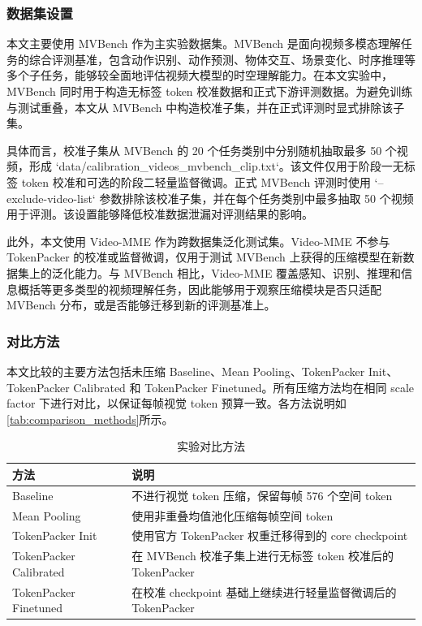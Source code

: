 \subsubsection{数据集设置}

本文主要使用 MVBench 作为主实验数据集。MVBench 是面向视频多模态理解任务的综合评测基准，包含动作识别、动作预测、物体交互、场景变化、时序推理等多个子任务，能够较全面地评估视频大模型的时空理解能力\cite{mvbench2024}。在本文实验中，MVBench 同时用于构造无标签 token 校准数据和正式下游评测数据。为避免训练与测试重叠，本文从 MVBench 中构造校准子集，并在正式评测时显式排除该子集。

具体而言，校准子集从 MVBench 的 20 个任务类别中分别随机抽取最多 50 个视频，形成 `data/calibration\_videos\_mvbench\_clip.txt`。该文件仅用于阶段一无标签 token 校准和可选的阶段二轻量监督微调。正式 MVBench 评测时使用 `--exclude-video-list` 参数排除该校准子集，并在每个任务类别中最多抽取 50 个视频用于评测。该设置能够降低校准数据泄漏对评测结果的影响。

此外，本文使用 Video-MME 作为跨数据集泛化测试集\cite{videomme2025}。Video-MME 不参与 TokenPacker 的校准或监督微调，仅用于测试 MVBench 上获得的压缩模型在新数据集上的泛化能力。与 MVBench 相比，Video-MME 覆盖感知、识别、推理和信息概括等更多类型的视频理解任务，因此能够用于观察压缩模块是否只适配 MVBench 分布，或是否能够迁移到新的评测基准上。

\subsubsection{对比方法}

本文比较的主要方法包括未压缩 Baseline、Mean Pooling、TokenPacker Init、TokenPacker Calibrated 和 TokenPacker Finetuned。所有压缩方法均在相同 scale factor 下进行对比，以保证每帧视觉 token 预算一致。各方法说明如\autoref{tab:comparison_methods}所示。

\begin{table}[!htbp]
    \centering
    \caption{\label{tab:comparison_methods}实验对比方法}
    \begin{tabularx}{\textwidth}{lX}
        \toprule
        方法 & 说明 \\
        \midrule
        Baseline & 不进行视觉 token 压缩，保留每帧 576 个空间 token \\
        Mean Pooling & 使用非重叠均值池化压缩每帧空间 token \\
        TokenPacker Init & 使用官方 TokenPacker 权重迁移得到的 core checkpoint \\
        TokenPacker Calibrated & 在 MVBench 校准子集上进行无标签 token 校准后的 TokenPacker \\
        TokenPacker Finetuned & 在校准 checkpoint 基础上继续进行轻量监督微调后的 TokenPacker \\
        \bottomrule
    \end{tabularx}
\end{table}

